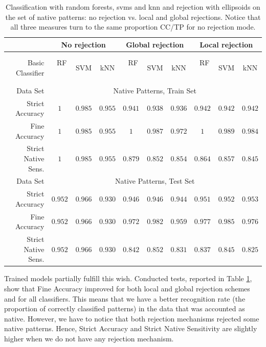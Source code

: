 \documentclass{llncs}
\begin{document}
\begin{table}[!b]
\vspace{-12pt}
\centering
\caption{Classification with random forests, svms and knn and rejection with ellipsoids on the set of native patterns: no rejection vs. local and global rejections. Notice that all three measures turn to the same proportion CC/TP for no rejection mode.}
\vspace{-6pt}
\setlength{\tabcolsep}{3pt}
\renewcommand{\arraystretch}{1}
{\footnotesize
\begin{tabular}{|r||c|c|c||c|c|c||c|c|c|}
\hline
& \multicolumn{3}{c||}{No rejection} & \multicolumn{3}{c||}{Global rejection} & \multicolumn{3}{c|}{Local rejection}\\
\hline
  Basic Classifier & $\;\;$RF$\;\;$ & $\,$SVM$\,$ & kNN & $\;\;$RF$\;\;$ & $\,$SVM$\,$ & kNN & $\;\;$RF$\;\;$ & $\,$SVM$\,$ & kNN  \\
  \hline
  Data Set & \multicolumn{9}{c|}{Native Patterns, Train Set} \\
\hline
Strict Accuracy     & $1$ & $0.985$ & $0.955$ & $0.941$ & $0.938$ & $0.936$ & $0.942$ & $0.942$ & $0.942$ \\
Fine Accuracy       & $1$ & $0.985$ & $0.955$ & $1$     & $0.987$ & $0.972$ & $1$ & $0.989$ & $0.984$ \\
Strict Native Sens. & $1$ & $0.985$ & $0.955$ & $0.879$ & $0.852$ & $0.854$ & $0.864$ & $0.857$ & $0.845$ \\
\hline
Data Set & \multicolumn{9}{c|}{Native Patterns, Test Set} \\
\hline
Strict Accuracy  & $0.952$ & $0.966$ & $0.930$ & $0.946$ & $0.946$ & $0.944$ & $0.951$ & $0.952$ & $0.953$ \\
Fine Accuracy       & $0.952$ & $0.966$ & $0.930$ & $0.972$ & $0.982$ & $0.959$ & $0.977$ & $0.985$ & $0.976$ \\
Strict Native Sens. & $0.952$ & $0.966$ & $0.930$ & $0.842$ & $0.852$ & $0.831$ & $0.837$ & $0.845$ & $0.825$ \\
\hline
\end{tabular}
}
\vspace{-6pt}
\label{tab:NativeNoForeign}
\end{table}

Trained models partially fulfill this wish. Conducted tests, reported in Table \ref{tab:NativeNoForeign}, show that Fine Accuracy improved for both local and global rejection schemes and for all classifiers. This means that we have a better recognition rate (the proportion of correctly classified patterns) in the data that was accounted as native. However, we have to notice that both rejection mechanisms rejected some native patterns. Hence, Strict Accuracy and Strict Native Sensitivity are slightly higher when we do not have any rejection mechanism.
\end{document}
